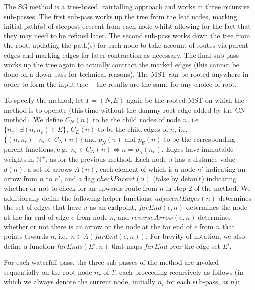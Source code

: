 \documentclass[preprint,a4paper]{elsarticle}
\begin{document}
The SG method is a tree-based, rainfalling approach and works in three recursive sub-passes. The first sub-pass works up the tree from the leaf nodes, marking initial path(s) of steepest descent from each node whilst allowing for the fact that they may need to be refined later. The second sub-pass works down the tree from the root, updating the path(s) for each node to take account of routes via parent edges and marking edges for later contraction as necessary. The final sub-pass works up the tree again to actually contract the marked edges (this cannot be done on a down pass for technical reasons). The MST can be rooted anywhere in order to form the input tree -- the results are the same for any choice of root.

To specify the method, let $T = (N,E)$ again be the rooted MST on which the method is to operate (this time without the dummy root edge added by the CN method). We define $C_N(n)$ to be the child nodes of node $n$, i.e.~$\{n_c \; | \; \exists (n,n_c) \in E\}$, $C_E(n)$ to be the child edges of $n$, i.e.~$\{(n,n_c) \; | \; n_c \in C_N(n)\}$ and $p_N(n)$ and $p_E(n)$ to be the corresponding parent functions, e.g.~$n_c \in C_N(n) \Leftrightarrow n = p_N(n_c)$. Edges have immutable weights in $\mathbb{N}^+$, as for the previous method. Each node $n$ has a distance value $d(n)$, a set of arrows $A(n)$, each element of which is a node $n'$ indicating an arrow from $n$ to $n'$, and a flag $checkParent(n)$ (false by default) indicating whether or not to check for an upwards route from $n$ in step $2$ of the method. We additionally define the following helper functions: $adjacentEdges(n)$ determines the set of edges that have $n$ as an endpoint, $farEnd(e,n)$ determines the node at the far end of edge $e$ from node $n$, and $reverseArrow(e,n)$ determines whether or not there is an arrow on the node at the far end of $e$ from $n$ that points towards $n$, i.e.~$n \in A(farEnd(e,n))$. For brevity of notation, we also define a function $farEnds(E',n)$ that maps $farEnd$ over the edge set $E'$.

For each waterfall pass, the three sub-passes of the method are invoked sequentially on the root node $n_r$ of $T$, each proceeding recursively as follows (in which we always denote the current node, initially $n_r$ for each sub-pass, as $n$):
\end{document}

